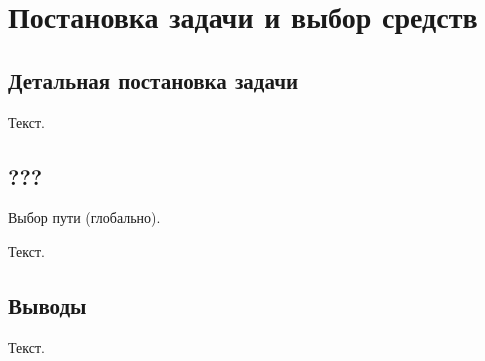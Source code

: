\chapter{Постановка задачи и выбор средств}

\section{Детальная постановка задачи}

Текст.

\section{???}

Выбор пути (глобально).

Текст.

\section{Выводы}

Текст.
